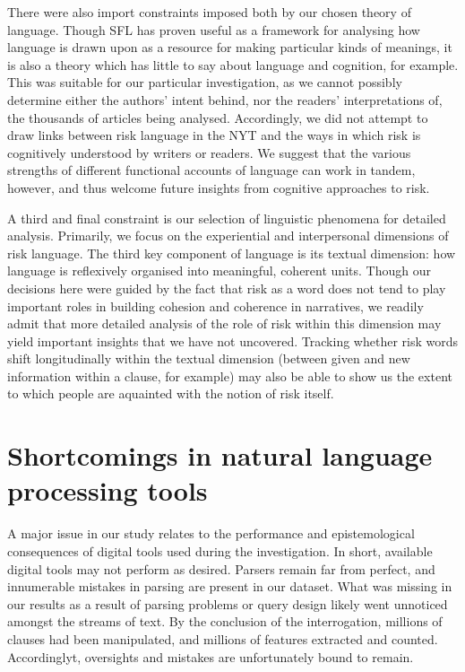 There were also import constraints imposed both by our chosen theory of language. Though SFL has proven useful as a framework for analysing how language is drawn upon as a resource for making particular kinds of meanings, it is also a theory which has little to say about language and cognition, for example. This was suitable for our particular investigation, as we cannot possibly determine either the authors' intent behind, nor the readers' interpretations of, the thousands of articles being analysed. Accordingly, we did not attempt to draw links between risk language in the NYT and the ways in which risk is cognitively understood by writers or readers. We suggest that the various strengths of different functional accounts of language can work in tandem, however, and thus welcome future insights from cognitive approaches to risk.

A third and final constraint is our selection of linguistic phenomena for detailed analysis. Primarily, we focus on the experiential and interpersonal dimensions of risk language. The third key component of language is its textual dimension: how language is reflexively organised into meaningful, coherent units. Though our decisions here were guided by the fact that risk as a word does not tend to play important roles in building cohesion and coherence in narratives, we readily admit that more detailed analysis of the role of risk within this dimension may yield important insights that we have not uncovered. Tracking whether risk words shift longitudinally within the textual dimension (between given and new information within a clause, for example) may also be able to show us the extent to which people are aquainted with the notion of risk itself.

\section{Shortcomings in natural language processing tools}

    A major issue in our study relates to the performance and epistemological consequences of digital tools used during the investigation. In short, available digital tools may not perform as desired. Parsers remain far from perfect, and innumerable mistakes in parsing are present in our dataset. What was missing in our results as a result of parsing problems or query design likely went unnoticed amongst the streams of text. By the conclusion of the interrogation, millions of clauses had been manipulated, and millions of features extracted and counted. Accordinglyt, oversights and mistakes are unfortunately bound to remain.

